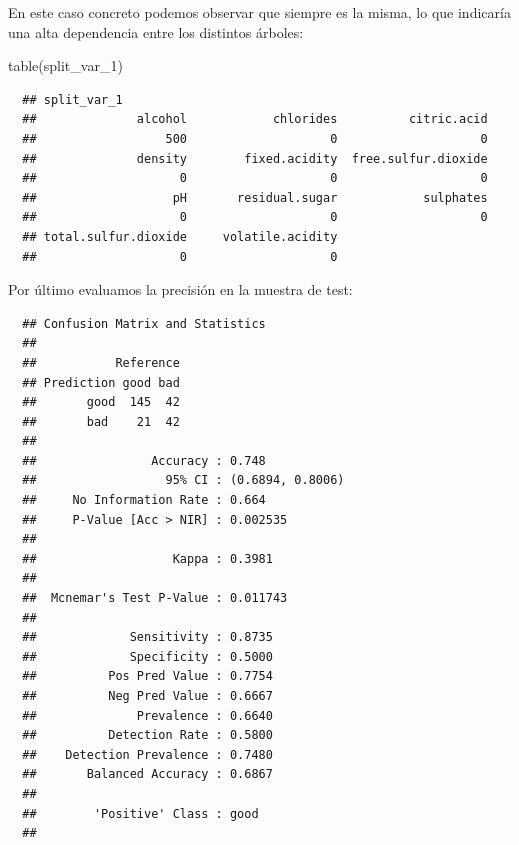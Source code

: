 \documentclass[
]{book}
\newenvironment{Shaded}{\begin{snugshade}}{\end{snugshade}}
\newcommand{\AttributeTok}[1]{\textcolor[rgb]{0.77,0.63,0.00}{#1}}
\newcommand{\FunctionTok}[1]{\textcolor[rgb]{0.00,0.00,0.00}{#1}}
\newcommand{\NormalTok}[1]{#1}
\newcommand{\OtherTok}[1]{\textcolor[rgb]{0.56,0.35,0.01}{#1}}
\newcommand{\SpecialCharTok}[1]{\textcolor[rgb]{0.00,0.00,0.00}{#1}}
\theoremstyle{break}
\theoremstyle{nonumberplain}
\begin{document}
En este caso concreto podemos observar que siempre es la misma, lo que indicaría una alta dependencia entre los distintos árboles:

\begin{Shaded}
\begin{Highlighting}[]
\FunctionTok{table}\NormalTok{(split\_var\_1)}
\end{Highlighting}
\end{Shaded}

\begin{verbatim}
  ## split_var_1
  ##              alcohol            chlorides          citric.acid 
  ##                  500                    0                    0 
  ##              density        fixed.acidity  free.sulfur.dioxide 
  ##                    0                    0                    0 
  ##                   pH       residual.sugar            sulphates 
  ##                    0                    0                    0 
  ## total.sulfur.dioxide     volatile.acidity 
  ##                    0                    0
\end{verbatim}

Por último evaluamos la precisión en la muestra de test:

\begin{Shaded}
\end{Shaded}

\begin{verbatim}
  ## Confusion Matrix and Statistics
  ## 
  ##           Reference
  ## Prediction good bad
  ##       good  145  42
  ##       bad    21  42
  ##                                           
  ##                Accuracy : 0.748           
  ##                  95% CI : (0.6894, 0.8006)
  ##     No Information Rate : 0.664           
  ##     P-Value [Acc > NIR] : 0.002535        
  ##                                           
  ##                   Kappa : 0.3981          
  ##                                           
  ##  Mcnemar's Test P-Value : 0.011743        
  ##                                           
  ##             Sensitivity : 0.8735          
  ##             Specificity : 0.5000          
  ##          Pos Pred Value : 0.7754          
  ##          Neg Pred Value : 0.6667          
  ##              Prevalence : 0.6640          
  ##          Detection Rate : 0.5800          
  ##    Detection Prevalence : 0.7480          
  ##       Balanced Accuracy : 0.6867          
  ##                                           
  ##        'Positive' Class : good            
  ## 
\end{verbatim}
\end{document}
